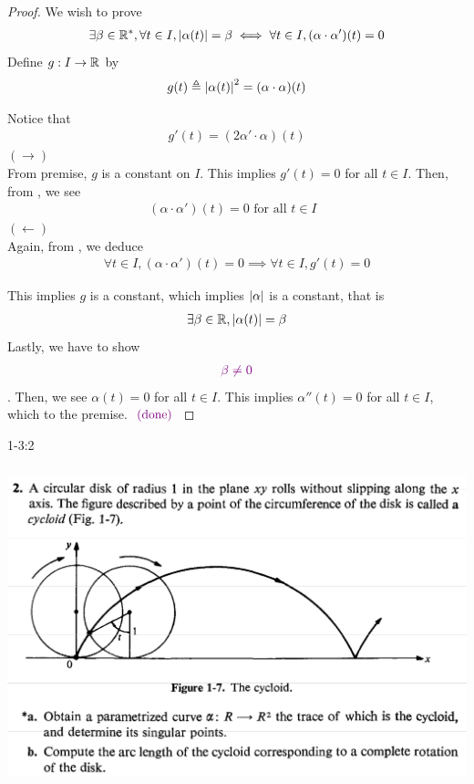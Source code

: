 \documentclass{report}
\begin{document}
\begin{proof}
We wish to prove 
\begin{align*}
\exists \beta  \in\mathbb{R}^*,  \forall t \in I, \left|\alpha (t)\right|=\beta  \iff \forall t \in I , (\alpha \cdot \alpha ')(t)=0
\end{align*}
Define $g:I\rightarrow \mathbb{R}$ by 
\begin{align*}
g(t)\triangleq \left|\alpha (t)\right|^2=(\alpha \cdot \alpha )(t)
\end{align*}

Notice that 
\begin{align}
\label{1.2.5.1}
g'(t)=(2\alpha '\cdot \alpha )(t)
\end{align}
$(\longrightarrow)$\\

From premise, $g$ is a constant on  $I$. This implies  $g'(t)=0$  for all $t \in I$. Then, from , we see 
\begin{align*}
  (\alpha \cdot \alpha ')(t)=0\text{ for all $t \in I$ }
\end{align*}
$(\longleftarrow)$\\

Again, from  , we deduce 
\begin{align*}
\forall t \in I , (\alpha \cdot \alpha ')(t)=0 \implies \forall t \in I, g'(t)=0
\end{align*}

This implies $g$ is a constant, which implies $\left|\alpha \right|$ is a constant, that is 
\begin{align*}
\exists \beta \in\mathbb{R}, \left|\alpha (t)\right|=\beta 
\end{align*}
Lastly, we have to show 
\begin{align*}
\textcolor{violet}{\text{ $\beta \neq 0$ }}
\end{align*}
. Then, we see $\alpha (t)=0$ for all $t \in I$. This implies $\alpha ''(t)=0 $ for all $t \in I$, which \CaC to the premise. $\textcolor{violet}{\text{ (done) }}$
\end{proof}
\begin{question}{1-3:2}{}
\includegraphics[height=10cm,width=18cm]{1.png}
\end{question}
\end{document}
